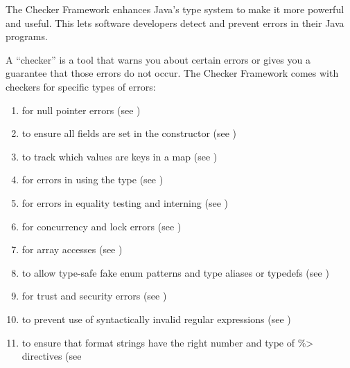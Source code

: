 \htmlhr
{}

The Checker Framework enhances Java's type system to make it more powerful
and useful.
This lets software developers detect and
prevent errors in their Java programs.

A ``checker'' is a tool that warns you about certain errors or gives you a
guarantee that those errors do not occur.
The Checker Framework comes with checkers for specific types of errors:

\begin{enumerate}

\item
   for null pointer errors
  (see )
\item
   to ensure all
  fields are set in the constructor (see
  )
\item
   to track which values are
  keys in a map (see )
\item
   for errors in using the
   type (see
  )
\item
   for errors in equality
  testing and interning (see )
\item
   for concurrency and lock errors
  (see )
\item
   for array accesses
  (see )
\item
   to allow type-safe fake enum
  patterns and type aliases or typedefs (see )
\item
   for trust and security errors
  (see )
\item
   to prevent use of syntactically
  invalid regular expressions (see )
\item
   to ensure that format
  strings have the right number and type of \<\%> directives (see

\end{enumerate}
